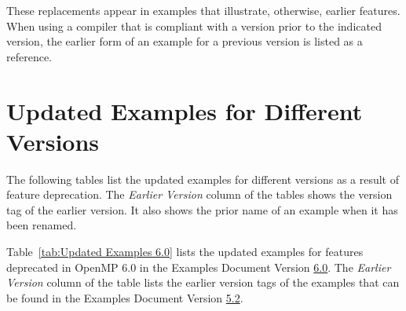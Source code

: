 \linenumbers
These replacements appear in examples that illustrate, otherwise, earlier features.
When using a compiler that is compliant with a version prior to 
the indicated version, the earlier form of an example for a previous
version is listed as a reference.

\newpage
\section{Updated Examples for Different Versions}
\label{sec:Updated Examples}

The following tables list the updated examples for different versions as 
a result of feature deprecation. The \emph{Earlier Version} column of 
the tables shows the version tag of the earlier version. It also shows
the prior name of an example when it has been renamed.


Table~\ref{tab:Updated Examples 6.0} lists the updated examples for 
features deprecated in OpenMP 6.0
in the Examples Document Version
\href{https://github.com/OpenMP/Examples/tree/v6.0}{6.0}.
The \emph{Earlier Version} column of the table lists the earlier version
tags of the examples that can be found in 
the Examples Document Version 
\href{https://github.com/OpenMP/Examples/tree/v5.2}{5.2}.


